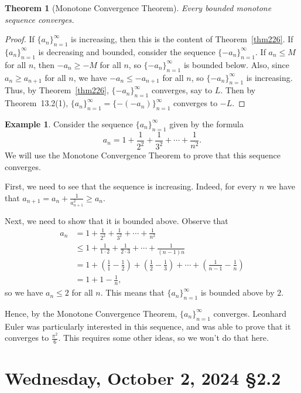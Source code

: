 \documentclass[12pt]{amsart}
\def\We{Wednesday}
\numberwithin{equation}{section}
\theoremstyle{plain} %
\newtheorem{thm}[equation]{Theorem}
\newcommand{\Oct}[3]{\section{#2, October #1, 2024 \quad \S#3}}
\theoremstyle{definition}
\newtheorem{ex}[equation]{Example}
\theoremstyle{remark}
\begin{document}
\begin{thm}[Monotone Convergence Theorem]\label{thm:MCT} Every bounded monotone sequence converges.
\end{thm}
\begin{proof}
If $\{a_n\}_{n=1}^\infty$ is increasing, then this is the content of Theorem~\ref{thm226}. If $\{a_n\}_{n=1}^\infty$ is decreasing and bounded, consider the sequence $\{-a_n\}_{n=1}^\infty$. If $a_n\leq M$ for all $n$, then $-a_n\geq -M$ for all $n$, so $\{-a_n\}_{n=1}^\infty$ is bounded below. Also, since $a_n \geq a_{n+1}$ for all $n$, we have $-a_n \leq -a_{n+1}$ for all $n$, so $\{-a_n\}_{n=1}^\infty$ is increasing. Thus, by Theorem~\ref{thm226}, $\{-a_n\}_{n=1}^\infty$ converges, say to $L$. Then by Theorem~13.2(1), $\{a_n\}_{n=1}^\infty=\{-(-a_n)\}_{n=1}^\infty$ converges to $-L$.
\end{proof}

	

\begin{ex}
	Consider the sequence $\{a_n\}_{n=1}^\infty$ given by the formula
	\[ a_n = 1 + \frac{1}{2^2} + \frac{1}{3^2} + \cdots + \frac{1}{n^2}.\]
	We will use the Monotone Convergence Theorem to prove that this sequence converges.
	
	First, we need to see that the sequence is increasing. Indeed, for every $n$ we have that $a_{n+1} = a_n + \frac{1}{a_{n+1}^2} \geq a_n$.
	
	Next, we need to show that it is bounded above. Observe that
	\begin{align*} 
a_n &= 1 + \frac{1}{2^2} + \frac{1}{3^2} + \cdots + \frac{1}{n^2} \\
&\leq 1 + \frac{1}{1 \cdot 2} + \frac{1}{2 \cdot 3} + \cdots + \frac{1}{(n-1) n}\\
&= 1+ (\frac{1}{1} - \frac{1}{2}) + (\frac{1}{2} - \frac{1}{3})
 + \cdots +  (\frac{1}{n-1} - \frac{1}{n})\\
 &= 1 + 1 - \frac{1}{n},
		\end{align*}
		so we have $a_n \leq 2$ for all $n$. This means that $\{a_n\}_{n=1}^\infty$ is bounded above by $2$. 
		
		Hence, by the Monotone Convergence Theorem, $\{a_n\}_{n=1}^\infty$ converges. Leonhard Euler was particularly interested in this sequence, and was able to prove that it converges to $\frac{\pi^2}{6}$. This requires some other ideas, so we won't do that here.
	\end{ex}
\newpage


\Oct{2}{\We}{2.2}
\end{document}
